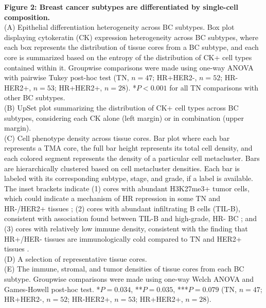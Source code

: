 \documentclass[preprint,review,3p,12pt]{elsarticle}
\begin{document}
\noindent 
\textbf{Figure 2: Breast cancer subtypes are differentiated by single-cell composition.} \\
(A) Epithelial differentiation heterogeneity across BC subtypes. Box plot displaying cytokeratin (CK) expression heterogeneity across BC subtypes, where each box represents the distribution of tissue cores from a BC subtype, and each core is summarized based on the entropy of the distribution of CK+ cell types contained within it. Groupwise comparisons were made using one-way ANOVA with pairwise Tukey post-hoc test (TN, $n=47$; HR+HER2-, $n=52$; HR-HER2+, $n=53$; HR+HER2+, $n=28$). *$P<0.001$ for all TN comparisons with other BC subtypes.\\ %
(B) UpSet plot summarizing the distribution of CK+ cell types across BC subtypes, considering each CK alone (left margin) or in combination (upper margin).\\
(C) Cell phenotype density across tissue cores. Bar plot where each bar represents a TMA core, the full bar height represents its total cell density, and each colored segment represents the density of a particular cell metacluster. Bars are hierarchically clustered based on cell metacluster densities. Each bar is labeled with its corresponding subtype, stage, and grade, if a label is available. The inset brackets indicate (1) cores with abundant H3K27me3+ tumor cells, which could indicate a mechanism of HR repression in some TN and HR-/HER2+ tissues \cite{histone2016}; (2) cores with abundant infiltrating B cells (TIL-B), consistent with association found between TIL-B and high-grade, HR- BC \cite{bcell2019}; and (3) cores with relatively low immune density, consistent with the finding that HR+/HER- tissues are immunologically cold compared to TN and HER2+ tissues \cite{pdl1a2015,pdl1b2015}.\\
(D) A selection of representative tissue cores.\\
(E) The immune, stromal, and tumor densities of tissue cores from each BC subtype. Groupwise comparisons were made using one-way Welch ANOVA and Games-Howell post-hoc test. *$P=0.034$, **$P=0.035$, ***$P=0.079$ (TN, $n=47$; HR+HER2-, $n=52$; HR-HER2+, $n=53$; HR+HER2+, $n=28$).
\end{document}
